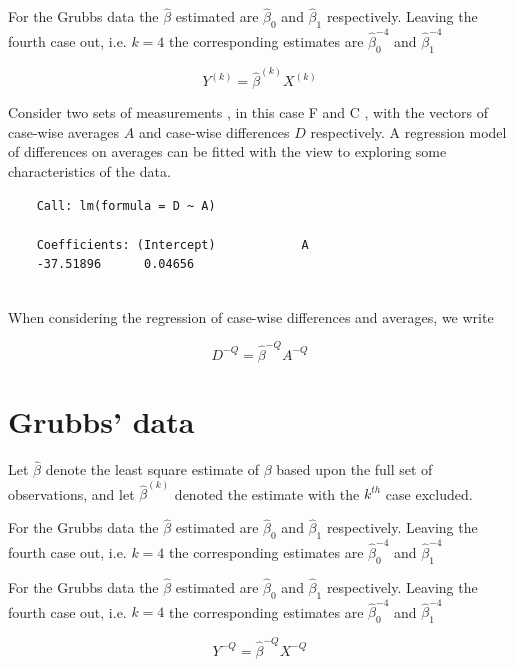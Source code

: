 \documentclass[12pt, a4paper]{report}
\theoremstyle{plain}
\theoremstyle{definition}
\theoremstyle{remark}
\begin{document}
	For the Grubbs data the $\hat{\beta}$ estimated are $\hat{\beta}_{0}$ and $\hat{\beta}_{1}$ respectively. Leaving the
	fourth case out, i.e. $k=4$ the corresponding estimates are $\hat{\beta}_{0}^{-4}$ and $\hat{\beta}_{1}^{-4}$
	
	\begin{equation}
	Y^{(k)} = \hat{\beta}^{(k)}X^{(k)}
	\end{equation}
	
	Consider two sets of measurements , in this case F and C , with the vectors of case-wise averages $A$ and case-wise differences $D$ respectively. A regression model of differences on averages can be fitted with the view to exploring some characteristics of the data.
	
	\begin{verbatim}
	Call: lm(formula = D ~ A)
	
	Coefficients: (Intercept)            A
	-37.51896      0.04656
	
	\end{verbatim}
	
	
	
	
	When considering the regression of case-wise differences and averages, we write
	
	\begin{equation}
	D^{-Q} = \hat{\beta}^{-Q}A^{-Q}
	\end{equation}
	
	\section{Grubbs' data}
	Let $\hat{\beta}$ denote the least square estimate of $\beta$ based upon the full set of observations, and let
	$\hat{\beta}^{(k)}$ denoted the estimate with the $k^{th}$ case excluded.
	
	For the Grubbs data the $\hat{\beta}$ estimated are $\hat{\beta}_{0}$ and $\hat{\beta}_{1}$ respectively. Leaving the fourth case out, i.e. $k=4$ the corresponding estimates are $\hat{\beta}_{0}^{-4}$ and $\hat{\beta}_{1}^{-4}$
	
	For the Grubbs data the $\hat{\beta}$ estimated are
	$\hat{\beta}_{0}$ and $\hat{\beta}_{1}$ respectively. Leaving the
	fourth case out, i.e. $k=4$ the corresponding estimates are
	$\hat{\beta}_{0}^{-4}$ and $\hat{\beta}_{1}^{-4}$
	
	
	\begin{equation}
	Y^{-Q} = \hat{\beta}^{-Q}X^{-Q}
	\end{equation}
	
\end{document}
